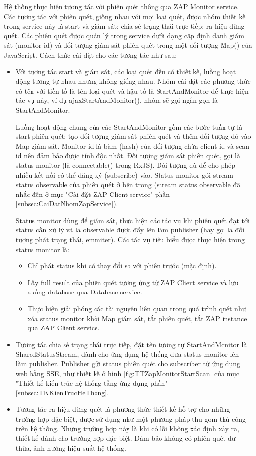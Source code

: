 Hệ thống thực hiện tương tác với phiên quét thông qua ZAP Monitor service.
Các tương tác với phiên quét, giống nhau với mọi loại quét, được nhóm thiết kế trong service này là start và giám sát; chia sẻ trạng thái trực tiếp; ra hiệu dừng quét.
Các phiên quét được quản lý trong service dưới dạng cặp định danh giám sát (monitor id) và đối tượng giám sát phiên quét trong một đối tượng Map() của JavaScript.
Cách thức cài đặt cho các tương tác như sau:

\begin{itemize}
  \item Với tương tác start và giám sát, các loại quét đều có thiết kế, luồng hoạt động tương tự nhau nhưng không giống nhau.
  Nhóm cài đặt các phương thức có tên với tiền tố là tên loại quét và hậu tố là StartAndMonitor để thực hiện tác vụ này, ví dụ ajaxStartAndMonitor(), nhóm sẽ gọi ngắn gọn là StartAndMonitor.
  
  Luồng hoạt động chung của các StartAndMonitor gồm các bước tuần tự là start phiên quét; tạo đối tượng giám sát phiên quét và thêm đối tượng đó vào Map giám sát.
  Monitor id là băm (hash) của đối tượng chứa client id và scan id nên đảm bảo được tính độc nhất.
  Đối tượng giám sát phiên quét, gọi là status monitor (là connectable() trong RxJS).
  Đối tượng dù để cho phép nhiều kết nối có thể đăng ký (subscribe) vào.
  Status monitor gói stream status observable của phiên quét ở bên trong (stream status observable đã nhắc đến ở mục "Cài đặt ZAP Client service" phần \ref{subsec:CaiDatNhomZapService}).
  
  Status monitor dùng để giám sát, thực hiện các tác vụ khi phiên quét đạt tới status cần xử lý và là observable được đẩy lên làm publisher (hay gọi là đối tượng phát trạng thái, emmiter).
  Các tác vụ tiêu biểu được thực hiện trong status monitor là:
  \begin{itemize}
    \item Chỉ phát status khi có thay đổi so với phiên trước (mặc định).
    \item Lấy full result của phiên quét tương ứng từ ZAP Client service và lưu xuống database qua Database service.
    \item Thực hiện giải phóng các tài nguyên liên quan trong quá trình quét như xóa status monitor khỏi Map giám sát, tắt phiên quét, tắt ZAP instance qua ZAP Client service.
  \end{itemize}
  
  \item Tương tác chia sẻ trạng thái trực tiếp, đặt tên tương tự StartAndMonitor là SharedStatusStream, dành cho ứng dụng hệ thống đưa status monitor lên làm publisher.
  Publisher gửi status phiên quét cho subscriber từ ứng dụng web bằng SSE, như thiết kế ở hình \ref{fig:TTZapMonitorStartScan} của mục "Thiết kế kiến trúc hệ thống tầng ứng dụng phần" \ref{subsec:TKKienTrucHeThong}.
  \item Tương tác ra hiệu dừng quét là phương thức thiết kế hỗ trợ cho những trường hợp đặc biệt, được sử dụng như một phương pháp thu gom thủ công trên hệ thống. Những trường hợp này là khi có lỗi không xác định xảy ra, thiết kế dành cho trường hợp đặc biệt. Đảm bảo không có phiên quét dư thừa, ảnh hưởng hiệu suất hệ thống.
\end{itemize}

